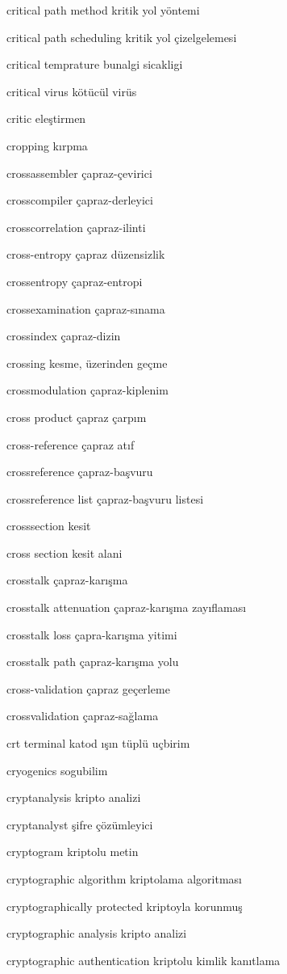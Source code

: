 \documentclass[12pt,fleqn]{article}\usepackage{../../common}
\begin{document}
critical path method kritik yol yöntemi

critical path scheduling kritik yol çizelgelemesi

critical temprature bunalgi sicakligi

critical virus kötücül virüs

critic eleştirmen

cropping kırpma

crossassembler çapraz-çevirici

crosscompiler çapraz-derleyici

crosscorrelation çapraz-ilinti

cross-entropy çapraz düzensizlik

crossentropy çapraz-entropi

crossexamination çapraz-sınama

crossindex çapraz-dizin

crossing kesme, üzerinden geçme

crossmodulation çapraz-kiplenim

cross product çapraz çarpım

cross-reference çapraz atıf

crossreference çapraz-başvuru

crossreference list çapraz-başvuru listesi

crosssection kesit

cross section kesit alani

crosstalk çapraz-karışma

crosstalk attenuation çapraz-karışma zayıflaması

crosstalk loss çapra-karışma yitimi

crosstalk path çapraz-karışma yolu

cross-validation çapraz geçerleme

crossvalidation çapraz-sağlama

crt terminal katod ışın tüplü uçbirim

cryogenics sogubilim

cryptanalysis kripto analizi

cryptanalyst şifre çözümleyici

cryptogram kriptolu metin

cryptographic algorithm kriptolama algoritması

cryptographically protected kriptoyla korunmuş

cryptographic analysis kripto analizi

cryptographic authentication kriptolu kimlik kanıtlama
\end{document}

